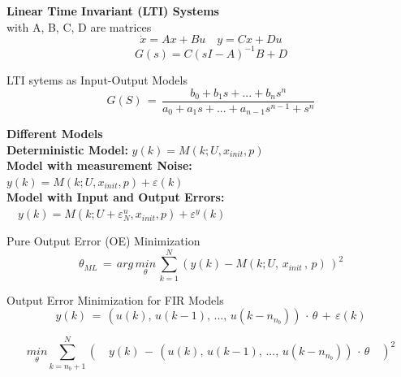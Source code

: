 \begin{tcolorbox}[colback=green!5!white,colframe=green!75!black,title=Dynamic Models]
\textbf{Linear Time Invariant (LTI) Systems}\\
with A, B, C, D are matrices
\begin{equation*}
\dot { x } =Ax+Bu \quad y=Cx+Du 
\end{equation*}
\begin{equation*}
G(s)=C{ (sI-A) }^{ -1 }B+D
\end{equation*}

LTI sytems as Input-Output Models
\begin{equation*}
G(S)\, =\, \frac { b_0 + b_1s+...+b_ns^n }{ a_0+a_1s+...+a_{n-1}s^{n-1}+s^n } 
\end{equation*}

\textbf{Different Models}\\
\textbf{Deterministic Model:} \(y(k)=M(k;U,{ x }_{ init },p)\) \\
\textbf{Model with measurement Noise:} \\ \(y(k)=M(k;U,{ x }_{ init },p)+\varepsilon(k)\) \\
\textbf{Model with Input and Output Errors:} \\ \( \quad y(k)=M(k;U+{\varepsilon  }_{ N }^{ u },{ x }_{ init },p)+{ { \varepsilon }^{ y } }(k)\)


Pure Output Error (OE) Minimization
\begin{equation*}
\theta _{ ML } \, =\, arg\, \underset { \theta  }{ min } \, \sum _{ k=1 }^{ N }{ (y(k)-M(k;U,\, x_{ init }\, ,\, p)\, )^{ 2 } }
\end{equation*}

Output Error Minimization for FIR Models
\begin{equation*}
y(k) \, = \, (u(k),\, u(k-1),\, ...,\, u(k-n_{n_b})) \, \cdot \, \theta \, + \, \varepsilon(k)
\end{equation*}

\begin{equation*}
\underset { \theta  }{ min } \sum _{ k=n_{ b }+1 }^{ N }{ (\quad y(k)\, -\, (u(k),\, u(k-1),\, ...,\, u(k-n_{ n_{ b } }))\, \cdot \, \theta \quad )^{ 2 } } 
\end{equation*}



\end{tcolorbox}
